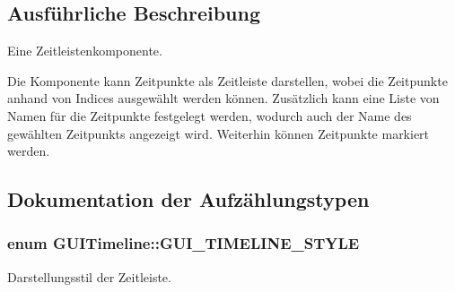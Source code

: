 \subsection{Ausführliche Beschreibung}
Eine Zeitleistenkomponente. 

Die Komponente kann Zeitpunkte als Zeitleiste darstellen, wobei die Zeitpunkte anhand von Indices ausgewählt werden können. Zusätzlich kann eine Liste von Namen für die Zeitpunkte festgelegt werden, wodurch auch der Name des gewählten Zeitpunkts angezeigt wird. Weiterhin können Zeitpunkte markiert werden. 

\subsection{Dokumentation der Aufzählungstypen}
\hypertarget{classGUITimeline_a56f1cf170a8c077a0b94d19a0eba8c94}{
\subsubsection[{G\-U\-I\-\_\-\-T\-I\-M\-E\-L\-I\-N\-E\-\_\-\-S\-T\-Y\-L\-E}]{\setlength{\rightskip}{0pt plus 5cm}enum {\bf G\-U\-I\-Timeline\-::\-G\-U\-I\-\_\-\-T\-I\-M\-E\-L\-I\-N\-E\-\_\-\-S\-T\-Y\-L\-E}}}\label{classGUITimeline_a56f1cf170a8c077a0b94d19a0eba8c94}
Darstellungsstil der Zeitleiste. 

